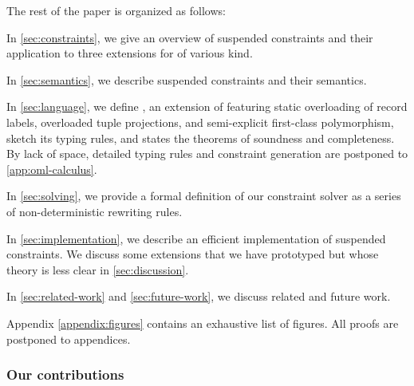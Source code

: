 \documentclass[acmsmall,screen,nonacm,review]{acmart}
\begin{document}
The rest of the paper is organized as follows:
\begin{enumerate*}[label={}]

\item
  In \cref{sec:constraints}, we give an overview of suspended constraints
  and their application to three extensions for \ML of various kind.

\item
  In \cref{sec:semantics}, we describe suspended constraints and their semantics.

\item
  In \cref{sec:language}, we define \OML, an extension of \ML featuring static
  overloading of record labels, overloaded tuple projections, and
  semi-explicit first-class polymorphism, sketch its typing rules,
  and states the theorems of soundness and completeness.
  By lack of space, detailed typing rules and constraint generation are
  postponed to \cref {app:oml-calculus}.

\item
  In \cref{sec:solving}, we provide a formal definition of our constraint
  solver as a series of non-deterministic rewriting rules.

\item
  In \cref{sec:implementation}, we describe an efficient implementation
    of suspended constraints. We discuss some extensions that we have prototyped
    but whose theory is less clear in \cref{sec:discussion}.

\item
  In \cref{sec:related-work} and \cref{sec:future-work}, we discuss related
  and future work.

\end{enumerate*}
Appendix \cref{appendix:figures} contains an exhaustive list of figures.
All proofs are postponed to appendices.

\subsubsection* {Our contributions}
\end{document}
